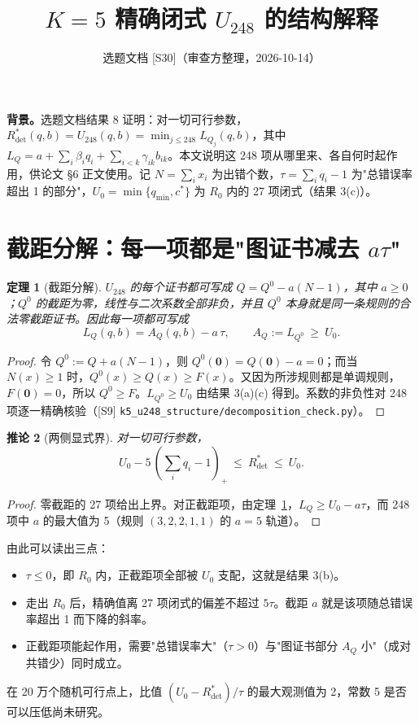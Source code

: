\documentclass[11pt,a4paper]{article}
\title{$K=5$ 精确闭式 $U_{248}$ 的结构解释}
\author{选题文档 [S30]（审查方整理，2026-10-14）}
\date{}
\newtheorem{theorem}{定理}
\newtheorem{corollary}[theorem]{推论}
\theoremstyle{remark}
\newcommand{\Rdet}{R^*_{\mathrm{det}}}
\begin{document}
\maketitle
\sloppy

\noindent\textbf{背景。}选题文档结果 8 证明：对一切可行参数，$\Rdet(q,b)=U_{248}(q,b)=\min_{j\le248}L_{Q_j}(q,b)$，其中 $L_Q=a+\sum_i\beta_iq_i+\sum_{i<k}\gamma_{ik}b_{ik}$。本文说明这 248 项从哪里来、各自何时起作用，供论文 \S6 正文使用。记 $N=\sum_ix_i$ 为出错个数，$\tau=\sum_iq_i-1$ 为"总错误率超出 1 的部分"，$U_0=\min\{q_{\min},c^*\}$ 为 $R_0$ 内的 27 项闭式（结果 3(c)）。

\section{截距分解：每一项都是"图证书减去 $a\tau$"}

\begin{theorem}[截距分解]\label{thm:dec}
$U_{248}$ 的每个证书都可写成 $Q=Q^0-a(N-1)$，其中 $a\ge0$；$Q^0$ 的截距为零，线性与二次系数全部非负，并且 $Q^0$ 本身就是同一条规则的合法零截距证书。因此每一项都可写成
\[
L_Q(q,b)=A_Q(q,b)-a\,\tau,\qquad A_Q:=L_{Q^0}\ \ge\ U_0 .
\]
\end{theorem}
\begin{proof}
令 $Q^0:=Q+a(N-1)$，则 $Q^0(\mathbf 0)=Q(\mathbf 0)-a=0$；而当 $N(x)\ge1$ 时，$Q^0(x)\ge Q(x)\ge F(x)$。又因为所涉规则都是单调规则，$F(\mathbf 0)=0$，所以 $Q^0\ge F$。$L_{Q^0}\ge U_0$ 由结果 3(a)(c) 得到。系数的非负性对 248 项逐一精确核验（[S9] \texttt{k5\_u248\_structure/decomposition\_check.py}）。
\end{proof}

\begin{corollary}[两侧显式界]\label{cor:sandwich}
对一切可行参数，
\[
U_0-5\,(\textstyle\sum_iq_i-1)_+\ \le\ \Rdet\ \le\ U_0 .
\]
\end{corollary}
\begin{proof}
零截距的 27 项给出上界。对正截距项，由定理~\ref{thm:dec}，$L_Q\ge U_0-a\tau$，而 248 项中 $a$ 的最大值为 5（规则 $(3,2,2,1,1)$ 的 $a=5$ 轨道）。
\end{proof}

由此可以读出三点：
\begin{itemize}
\item $\tau\le0$，即 $R_0$ 内，正截距项全部被 $U_0$ 支配，这就是结果 3(b)。
\item 走出 $R_0$ 后，精确值离 27 项闭式的偏差不超过 $5\tau$。截距 $a$ 就是该项随总错误率超出 1 而下降的斜率。
\item 正截距项能起作用，需要"总错误率大"（$\tau>0$）与"图证书部分 $A_Q$ 小"（成对共错少）同时成立。
\end{itemize}
在 20 万个随机可行点上，比值 $(U_0-\Rdet)/\tau$ 的最大观测值为 2，常数 5 是否可以压低尚未研究。
\end{document}
